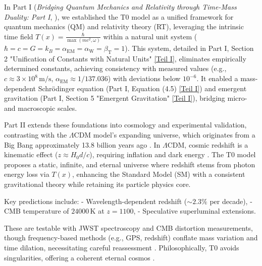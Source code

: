 \documentclass[12pt,a4paper]{article}
\newcommand{\Tfield}{T(x)}
\newcommand{\alphaEM}{\alpha_{\text{EM}}}
\newcommand{\alphaW}{\alpha_{\text{W}}}
\newcommand{\betaT}{\beta_{\text{T}}}
\begin{document}
	In Part I (\textit{Bridging Quantum Mechanics and Relativity through Time-Mass Duality: Part I}, \cite{pascher_part1_2025}), we established the T0 model as a unified framework for quantum mechanics (QM) and relativity theory (RT), leveraging the intrinsic time field \(\Tfield = \frac{\hbar}{\max(mc^2, \omega)}\) within a natural unit system (\(\hbar = c = G = k_B = \alphaEM = \alphaW = \betaT = 1\)). This system, detailed in Part I, Section 2 "Unification of Constants with Natural Units" \href{https://github.com/jpascher/T0-Time-Mass-Duality/tree/main/2/pdf/English/Bridging Quantum Mechanics and Relativity through Time-Mass Duality Part I Theoretical Foundations_en.pdf}{[Teil I]}, eliminates empirically determined constants, achieving consistency with measured values (e.g., \(c \approx 3 \times 10^8 \, \text{m/s}\), \(\alphaEM \approx 1/137.036\)) with deviations below \(10^{-6}\). It enabled a mass-dependent Schrödinger equation (Part I, Equation (4.5) \href{https://github.com/jpascher/T0-Time-Mass-Duality/tree/main/2/pdf/English/Bridging Quantum Mechanics and Relativity through Time-Mass Duality Part I Theoretical Foundations_en.pdf}{[Teil I]}) and emergent gravitation (Part I, Section 5 "Emergent Gravitation" \href{https://github.com/jpascher/T0-Time-Mass-Duality/tree/main/2/pdf/English/Bridging Quantum Mechanics and Relativity through Time-Mass Duality Part I Theoretical Foundations_en.pdf}{[Teil I]}), bridging micro- and macroscopic scales.
	
	Part II extends these foundations into cosmology and experimental validation, contrasting with the \(\Lambda\)CDM model’s expanding universe, which originates from a Big Bang approximately 13.8 billion years ago \cite{Planck2020}. In \(\Lambda\)CDM, cosmic redshift is a kinematic effect (\(z \approx H_0 d / c\)), requiring inflation and dark energy \cite{Riess1998,Perlmutter1999}. The T0 model proposes a static, infinite, and eternal universe where redshift stems from photon energy loss via \(\Tfield\), enhancing the Standard Model (SM) with a consistent gravitational theory while retaining its particle physics core.
	
	Key predictions include:
	- Wavelength-dependent redshift (\(\sim 2.3\%\) per decade),
	- CMB temperature of \(24000 \, \text{K}\) at \(z = 1100\),
	- Speculative superluminal extensions.
	
	These are testable with JWST spectroscopy and CMB distortion measurements, though frequency-based methods (e.g., GPS, redshift) conflate mass variation and time dilation, necessitating careful reassessment \cite{pascher_quantum_2025}. Philosophically, T0 avoids singularities, offering a coherent eternal cosmos \cite{pascher_perspective_2025}.
	
\end{document}
